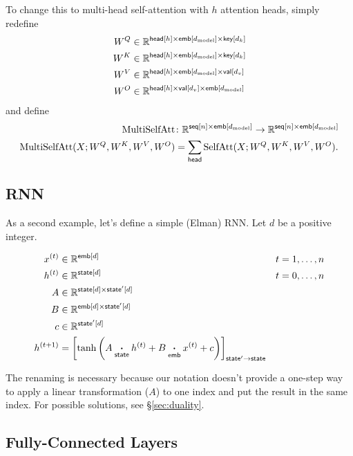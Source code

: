 \documentclass{article}
\newcommand{\dmodel}{d_{\text{model}}}
\begin{document}
To change this to multi-head self-attention with $h$ attention heads, simply redefine 
\begin{align*}
  W^Q &\in \mathbb{R}^{\nset{head}{h} \times \nset{emb}{\dmodel} \times \nset{key}{d_k}} \\
  W^K &\in \mathbb{R}^{\nset{head}{h} \times \nset{emb}{\dmodel} \times \nset{key}{d_k}} \\
  W^V &\in \mathbb{R}^{\nset{head}{h} \times \nset{emb}{\dmodel} \times \nset{val}{d_v}} \\
  W^O &\in \mathbb{R}^{\nset{head}{h} \times \nset{val}{d_v} \times \nset{emb}{\dmodel}}
\end{align*}
and define
\begin{align*}
\text{MultiSelfAtt} &\colon \mathbb{R}^{\nset{seq}{n} \times\nset{emb}{\dmodel}} \rightarrow \mathbb{R}^{\nset{seq}{n} \times\nset{emb}{\dmodel}} \\
\text{MultiSelfAtt}(X; W^Q, W^K, W^V, W^O) &= \nsum{head} \text{SelfAtt}(X; W^Q, W^K, W^V, W^O).
\end{align*}

\subsection{RNN}
\label{sec:rnn}

As a second example, let's define a simple (Elman) RNN. Let $d$ be a positive integer.

\begin{align*}
x^{(t)} &\in \mathbb{R}^{\nset{emb}{d}} & t &= 1, \ldots, n \\
h^{(t)} &\in \mathbb{R}^{\nset{state}{d}} & t &= 0, \ldots, n\\
A &\in \mathbb{R}^{\nset{state}{d} \times \nset{state'}{d}} \\
B &\in \mathbb{R}^{\nset{emb}{d} \times \nset{state'}{d}} \\
c &\in \mathbb{R}^{\nset{state'}{d}} \\
h^{(t+1)} &= \nmov{state'}{state}{\tanh\left( A \ndot{state} h^{(t)} + B \ndot{emb} x^{(t)} + c \right)}
\end{align*}

The renaming is necessary because our notation doesn't provide a one-step way to apply a linear transformation ($A$) to one index and put the result in the same index. For possible solutions, see \S\ref{sec:duality}.

\subsection{Fully-Connected Layers}
\end{document}
